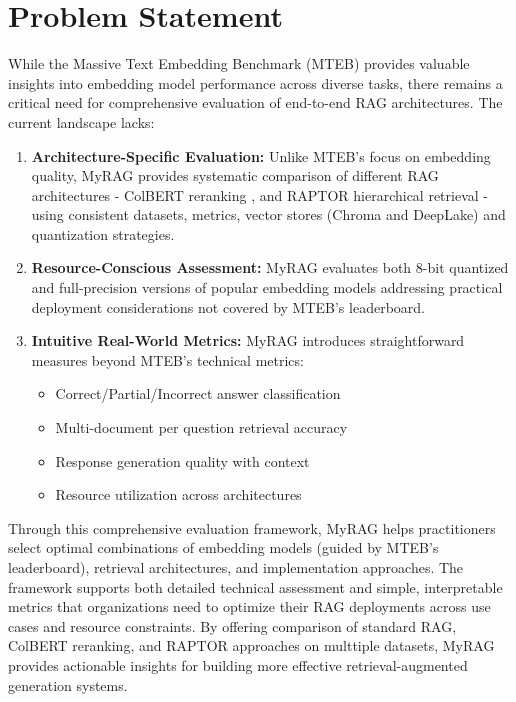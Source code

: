 \documentclass[pdflatex,sn-mathphys-num]{sn-jnl}%
\theoremstyle{thmstyleone}%
\theoremstyle{thmstyletwo}%
\theoremstyle{thmstylethree}%
\begin{document}
\section{Problem Statement}\label{sec2}

While the Massive Text Embedding Benchmark (MTEB) \cite{muennighoff2022mteb} provides valuable insights into embedding model performance across diverse tasks, there remains a critical need for comprehensive evaluation of end-to-end RAG architectures. The current landscape lacks:

\begin{enumerate}
    \item \textbf{Architecture-Specific Evaluation:} Unlike MTEB's focus on embedding quality, MyRAG provides systematic comparison of different RAG architectures - ColBERT reranking \cite{khattab2020colbert}, and RAPTOR hierarchical retrieval \cite{wu2021recursively, raptor2024} - using consistent datasets, metrics, vector stores (Chroma and DeepLake) and quantization strategies.
    
    \item \textbf{Resource-Conscious Assessment:} MyRAG evaluates both 8-bit quantized and full-precision versions of popular embedding models addressing practical deployment considerations not covered by MTEB's leaderboard.
    
    \item \textbf{Intuitive Real-World Metrics:} MyRAG introduces straightforward measures beyond MTEB's technical metrics:
    \begin{itemize}
        \item Correct/Partial/Incorrect answer classification
        \item Multi-document per question retrieval accuracy 
        \item Response generation quality with context
        \item Resource utilization across architectures
    \end{itemize}
\end{enumerate}

Through this comprehensive evaluation framework, MyRAG helps practitioners select optimal combinations of embedding models (guided by MTEB's leaderboard), retrieval architectures, and implementation approaches. The framework supports both detailed technical assessment and simple, interpretable metrics that organizations need to optimize their RAG deployments across use cases and resource constraints. By offering comparison of standard RAG, ColBERT reranking, and RAPTOR approaches on multtiple datasets, MyRAG provides actionable insights for building more effective retrieval-augmented generation systems.
\end{document}
